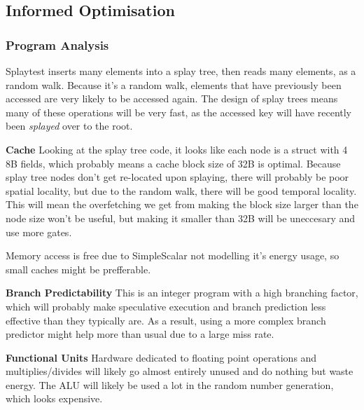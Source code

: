 \documentclass{article}
\begin{document}
\begin{multicols}{2}



  \subsection{Informed Optimisation}

  \subsubsection{Program Analysis}
  Splaytest inserts many elements into a splay tree, then reads many elements, as a random walk. Because it's a random walk, elements that have previously been accessed are very likely to be accessed again. The design of splay trees means many of these operations will be very fast, as the accessed key will have recently been \textit{splayed} over to the root.

  \textbf{Cache} Looking at the splay tree code, it looks like each node is a struct with 4 8B fields, which probably means a cache block size of 32B is optimal. Because splay tree nodes don't get re-located upon splaying, there will probably be poor spatial locality, but due to the random walk, there will be good temporal locality. This will mean the overfetching we get from making the block size larger than the node size won't be useful, but making it smaller than 32B will be uneccesary and use more gates.

  Memory access is free due to SimpleScalar not modelling it's energy usage, so small caches might be prefferable.

  \textbf{Branch Predictability} This is an integer program with a high branching factor, which will probably make speculative execution and branch prediction less effective than they typically are. As a result, using a more complex branch predictor might help more than usual due to a large miss rate.

  \textbf{Functional Units} Hardware dedicated to floating point operations and multiplies/divides will likely go almost entirely unused and do nothing but waste energy. The ALU will likely be used a lot in the random number generation, which looks expensive.


\end{multicols}
\end{document}
